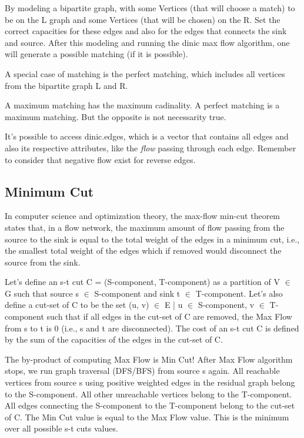 		By modeling a bipartite graph, with some Vertices (that will choose a match) to be on the L graph and some Vertices (that will be chosen) on the R.
		Set the correct capacities for these edges and also for the edges that connects the sink and source. After this modeling
		and running the dinic max flow algorithm, one will generate a possible matching (if it is possible).

		A special case of matching is the perfect matching, which includes all vertices from the bipartite graph L and R.

		A maximum matching has the maximum cadinality. A perfect matching is a maximum matching. 
		But the opposite is not necessarity true.

		It's possible to access dinic.edges, which is a vector that contains all edges and also its respective attributes, 
		like the \textit{flow} passing through each edge. Remember to consider that negative flow exist for reverse edges.

	\subsection{Minimum Cut}

		In computer science and optimization theory, the max-flow min-cut theorem states that, in a flow network, 
		the maximum amount of flow passing from the source to the sink is equal to the total weight of the edges 
		in a minimum cut, i.e., the smallest total weight of the edges which if removed would disconnect the source from the sink. 

		Let's define an s-t cut C = (S-component, T-component) as a partition of V $\in$ G such that 
		source s $\in$ S-component and sink t $\in$ T-component. Let's also define a cut-set of C to be the set 
		(u, v) $\in$ E | u $\in$ S-component, v $\in$ T-component such that if all edges in the cut-set of C are removed,
		the Max Flow from s to t is 0 (i.e., s and t are disconnected). The cost of an s-t cut C is defined by the sum
		of the capacities of the edges in the cut-set of C.

		The by-product of computing Max Flow is Min Cut! After Max Flow algorithm stops, we run graph traversal (DFS/BFS)
		from source s again. All reachable vertices from source s using positive weighted edges in the residual graph belong
		to the S-component. All other unreachable vertices belong to the T-component. All edges connecting the S-component to
		the T-component belong to the cut-set of C. The Min Cut value is equal to the Max Flow value.
		This is the minimum over all possible s-t cuts values.

